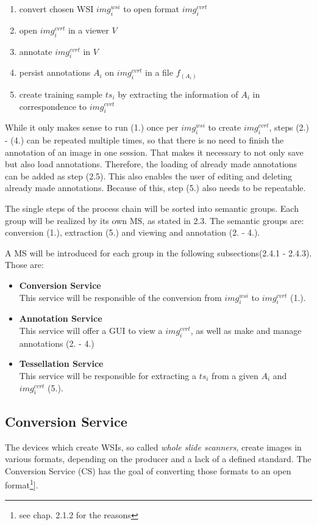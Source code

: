 \begin{enumerate}[(1.)]
	\item convert chosen WSI $img^{wsi}_i$ to open format $img^{cvrt}_i$
	\item open $img^{cvrt}_i$ in a viewer $V$
	\item annotate $img^{cvrt}_i$ in $V$
	\item persist annotations $A_i$ on $img^{cvrt}_i$ in a file $f_{(A_i)}$
	\item create training sample $ts_i$ by extracting the information of $A_i$ in correspondence to $img^{cvrt}_i$
\end{enumerate}

While it only makes sense to run (1.) once per $img^{wsi}_i$ to create $img^{cvrt}_i$, steps (2.) - (4.) can be repeated multiple times, so that there is no need to finish the annotation of an image in one session. That makes it necessary to not only save but also load annotations. Therefore, the loading of already made annotations can be added as step (2.5). This also enables the user of editing and deleting already made annotations. Because of this, step (5.) also needs to be repeatable.

The single steps of the process chain will be sorted into semantic groups. Each group will be realized by its own MS, as stated in 2.3. The semantic groups are: conversion (1.), extraction (5.) and viewing and annotation (2. - 4.).

A MS will be introduced for each group in the following subsections(2.4.1 - 2.4.3). Those are:

\begin{itemize}
	\item \textbf{Conversion Service}\\
	This service will be responsible of the conversion from $img^{wsi}_i$ to $img^{cvrt}_i$ (1.).
	\item \textbf{Annotation Service}\\
	This service will offer a GUI to view a $img^{cvrt}_i$, as well as make and manage annotations (2. - 4.)
	\item \textbf{Tessellation Service}\\
	This service will be responsible for extracting a $ts_i$ from a given $A_i$ and $img^{cvrt}_i$ (5.).
\end{itemize}


\subsection{Conversion Service}
The devices which create WSIs, so called \emph{whole slide scanners}, create images in various formats, depending on the producer and a lack of a defined standard\cite{Cornish13}. The Conversion Service (CS) has the goal of converting those formats to an open format\footnote{see chap. 2.1.2 for the reasons}].

